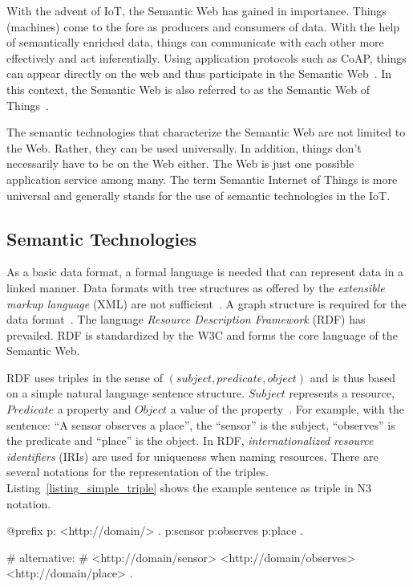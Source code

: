 \documentclass[english,version-2019-11]{uzl-thesis}
\begin{document}
With the advent of IoT, the Semantic Web has gained in importance. Things (machines) come to the fore as producers and consumers of data. With the help of semantically enriched data, things can communicate with each other more effectively and act inferentially. Using application protocols such as CoAP, things can appear directly on the web and thus participate in the Semantic Web~\cite{WoT}. In this context, the Semantic Web is also referred to as the Semantic Web of Things~\cite{WoT}.

The semantic technologies that characterize the Semantic Web are not limited to the Web. Rather, they can be used universally. In addition, things don't necessarily have to be on the Web either. The Web is just one possible application service among many. The term Semantic Internet of Things is more universal and generally stands for the use of semantic technologies in the IoT.
\subsection{Semantic Technologies}
As a basic data format, a formal language is needed that can represent data in a linked manner. Data formats with tree structures as offered by the \emph{extensible markup language} (XML) are not sufficient~\cite{SWBookHitzler}. A graph structure is required for the data format~\cite{SWBookHitzler}. The language \emph{Resource Description Framework} (RDF) has prevailed. RDF is standardized by the W3C and forms the core language of the Semantic Web.

RDF uses triples in the sense of $(subject, predicate, object)$ and is thus based on a simple natural language sentence structure. $Subject$ represents a resource, $Predicate$ a property and $Object$ a value of the property~\cite{SWBook}. For example, with the sentence: \enquote{A sensor observes a place}, the \enquote{sensor} is the subject, \enquote{observes} is the predicate and \enquote{place} is the object. In RDF, \emph{internationalized resource identifiers} (IRIs) are used for uniqueness when naming resources. There are several notations for the representation of the triples. Listing~\ref{listing_simple_triple} shows the example sentence as triple in N3 notation.
\begin{SPARQL}[caption={A simple example of an RDF triple in N3 notation.},
  float, label=listing_simple_triple, morekeywords={@prefix}, captionpos=b]
@prefix p: <http://domain/> .
p:sensor p:observes p:place .

# alternative:
# <http://domain/sensor> <http://domain/observes> <http://domain/place> .
\end{SPARQL}
\end{document}
